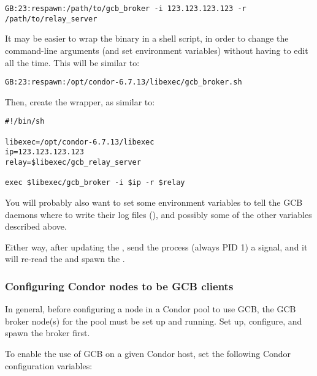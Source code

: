 \begin{itemize}
\footnotesize
\begin{verbatim}
GB:23:respawn:/path/to/gcb_broker -i 123.123.123.123 -r /path/to/relay_server
\end{verbatim}
\normalsize

It may be easier to wrap the  binary
in a shell script, in order to change the command-line arguments (and
set environment variables) without having to edit 
all the time.
This will be similar to:

\footnotesize
\begin{verbatim}
GB:23:respawn:/opt/condor-6.7.13/libexec/gcb_broker.sh
\end{verbatim}
\normalsize

Then, create the wrapper, as similar to: 

\footnotesize
\begin{verbatim}
#!/bin/sh

libexec=/opt/condor-6.7.13/libexec
ip=123.123.123.123
relay=$libexec/gcb_relay_server

exec $libexec/gcb_broker -i $ip -r $relay
\end{verbatim}
\normalsize

You will probably also want to set some environment variables to tell
the GCB daemons where to write their log files (),
and possibly some of the other variables described above.

Either way, after updating the , send
the  process (always PID 1) a \verb@SIGHUP@ signal, and it
will re-read the  and spawn the .

\end{itemize}

\subsubsection{\label{sec:GCB-condor-config}
Configuring Condor nodes to be GCB clients}

In general, before configuring a node in a Condor pool to use GCB,
the GCB broker node(s) for the pool must be set up and running.
Set up, configure, and spawn the broker first.

To enable the use of GCB on a given Condor host, set the following
Condor configuration variables:


